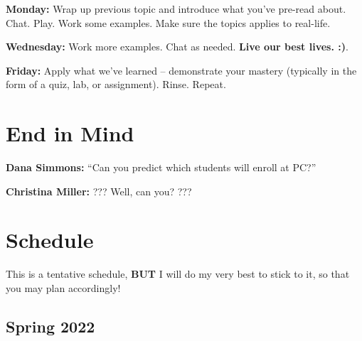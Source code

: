 \documentclass[
]{book}
\begin{document}
\textbf{Monday:} Wrap up previous topic and introduce what you've pre-read about. Chat. Play. Work some examples. Make sure the topics applies to real-life.

\textbf{Wednesday:} Work more examples. Chat as needed. \textbf{Live our best lives. :)}.

\textbf{Friday:} Apply what we've learned -- demonstrate your mastery (typically in the form of a quiz, lab, or assignment). Rinse. Repeat.

\hypertarget{end-in-mind}{%
\chapter{End in Mind}\label{end-in-mind}}

\textbf{Dana Simmons:} ``Can you predict which students will enroll at PC?''

\textbf{Christina Miller:} ??? Well, can you? ???

\hypertarget{schedule}{%
\chapter{Schedule}\label{schedule}}

This is a tentative schedule, \textbf{BUT} I will do my very best to stick to it, so that you may plan accordingly!

\hypertarget{spring-2022}{%
\section*{Spring 2022}\label{spring-2022}}
\end{document}
